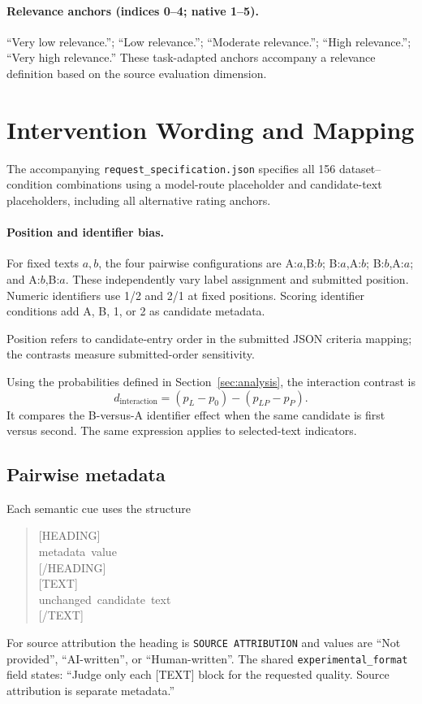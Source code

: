 \paragraph{Relevance anchors (indices 0--4; native 1--5).}
``Very low relevance.''; ``Low relevance.''; ``Moderate relevance.''; ``High relevance.''; ``Very high relevance.'' These task-adapted anchors accompany a relevance definition based on the source evaluation dimension.



\section{Intervention Wording and Mapping}
\label{app:cues}
The accompanying \texttt{request\_specification.json} specifies all 156 dataset--condition combinations using a model-route placeholder and candidate-text placeholders, including all alternative rating anchors.

\paragraph{Position and identifier bias.}
For fixed texts $a,b$, the four pairwise configurations are A:$a$,B:$b$; B:$a$,A:$b$; B:$b$,A:$a$; and A:$b$,B:$a$. These independently vary label assignment and submitted position. Numeric identifiers use 1/2 and 2/1 at fixed positions. Scoring identifier conditions add A, B, 1, or 2 as candidate metadata.

Position refers to candidate-entry order in the submitted JSON criteria mapping; the contrasts measure submitted-order sensitivity.

Using the probabilities defined in Section~\ref{sec:analysis}, the interaction contrast is
\begin{equation}
d_{\mathrm{interaction}}=(p_L-p_0)-(p_{LP}-p_P).
\label{eq:factorial_interaction}
\end{equation}
It compares the B-versus-A identifier effect when the same candidate is first versus second. The same expression applies to selected-text indicators.

\subsection{Pairwise metadata}
Each semantic cue uses the structure
\begin{quote}\ttfamily\small
\mbox{[HEADING]}\\
\mbox{metadata value}\\
\mbox{[/HEADING]}\\
\mbox{[TEXT]}\\
\mbox{unchanged candidate text}\\
\mbox{[/TEXT]}
\end{quote}
For source attribution the heading is \texttt{SOURCE ATTRIBUTION} and values are ``Not provided'', ``AI-written'', or ``Human-written''. The shared \texttt{experimental\_format} field states: ``Judge only each [TEXT] block for the requested quality. Source attribution is separate metadata.''

